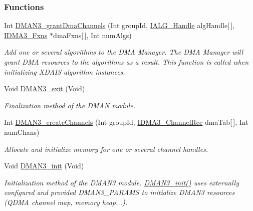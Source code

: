 \subsubsection*{Functions}
\begin{CompactItemize}
\item 
Int \hyperlink{group___d_s_p_d_m_a_n3_ge0e5031bc5e947da1bd5d12cca1c5e00}{DMAN3\_\-grant\-Dma\-Channels} (Int group\-Id, \hyperlink{struct_i_a_l_g___obj}{IALG\_\-Handle} alg\-Handle\mbox{[}$\,$\mbox{]}, \hyperlink{struct_i_d_m_a3___fxns}{IDMA3\_\-Fxns} $\ast$dma\-Fxns\mbox{[}$\,$\mbox{]}, Int num\-Algs)
\begin{CompactList}\small\item\em Add one or several algorithms to the DMA Manager. The DMA Manager will grant DMA resources to the algorithms as a result. This function is called when initializing XDAIS algorithm instances. \item\end{CompactList}\item 
Void \hyperlink{group___d_s_p_d_m_a_n3_gc26a2a6153c50b10dc3ae9106bfa8594}{DMAN3\_\-exit} (Void)
\begin{CompactList}\small\item\em Finalization method of the DMAN module. \item\end{CompactList}\item 
Int \hyperlink{group___d_s_p_d_m_a_n3_gee927c5ad460e5e5a122471ccb047db1}{DMAN3\_\-create\-Channels} (Int group\-Id, \hyperlink{struct_i_d_m_a3___channel_rec}{IDMA3\_\-Channel\-Rec} dma\-Tab\mbox{[}$\,$\mbox{]}, Int num\-Chans)
\begin{CompactList}\small\item\em Allocate and initialize memory for one or several channel handles. \item\end{CompactList}\item 
Void \hyperlink{group___d_s_p_d_m_a_n3_gf0a672c8ba5962dabc8b319978aafd3b}{DMAN3\_\-init} (Void)
\begin{CompactList}\small\item\em Initialization method of the DMAN3 module. \hyperlink{group___d_s_p_d_m_a_n3_gf0a672c8ba5962dabc8b319978aafd3b}{DMAN3\_\-init()} uses externally configured and provided DMAN3\_\-PARAMS to initialize DMAN3 resources (QDMA channel map, memory heap...). \item\end{CompactList}\item 

\end{CompactItemize}
